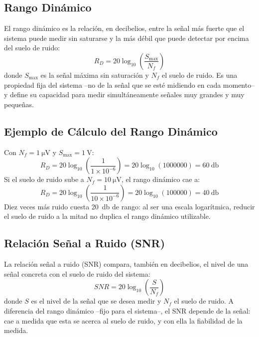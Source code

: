 \subsection{Rango Dinámico}\label{sec:rango_dinamico}
El rango dinámico es la relación, en decibelios, entre la señal más fuerte que el sistema puede medir sin saturarse y la más débil que puede detectar por encima del suelo de ruido:
\begin{equation}\label{eq:rango_dinamico}
    R_D = 20 \log_{10} \left( \frac{S_{\max}}{N_f} \right)
\end{equation}
donde $S_{\max}$ es la señal máxima sin saturación y $N_f$ el suelo de ruido. Es una propiedad fija del sistema --no de la señal que se esté midiendo en cada momento-- y define su capacidad para medir simultáneamente señales muy grandes y muy pequeñas.

\subsection{Ejemplo de Cálculo del Rango Dinámico}
Con $N_f = \SI{1}{\micro\volt}$ y $S_{\max} = \SI{1}{\volt}$:
\begin{equation}
    R_D = 20 \log_{10} \left( \frac{1}{1 \times 10^{-6}} \right) = 20 \log_{10} (1000000) = \SI{60}{\decibel}
\end{equation}
Si el suelo de ruido sube a $N_f = \SI{10}{\micro\volt}$, el rango dinámico cae a:
\begin{equation}
    R_D = 20 \log_{10} \left( \frac{1}{10 \times 10^{-6}} \right) = 20 \log_{10} (100000) = \SI{40}{\decibel}
\end{equation}
Diez veces más ruido cuesta \SI{20}{\decibel} de rango: al ser una escala logarítmica, reducir el suelo de ruido a la mitad no duplica el rango dinámico utilizable.

\subsection{Relación Señal a Ruido (SNR)}\label{sec:snr}
La relación señal a ruido (SNR) compara, también en decibelios, el nivel de una señal concreta con el suelo de ruido del sistema:
\begin{equation}
    SNR = 20 \log_{10} \left( \frac{S}{N_f} \right)
\end{equation}
donde $S$ es el nivel de la señal que se desea medir y $N_f$ el suelo de ruido. A diferencia del rango dinámico --fijo para el sistema--, el SNR depende de la señal: cae a medida que esta se acerca al suelo de ruido, y con ella la fiabilidad de la medida.

